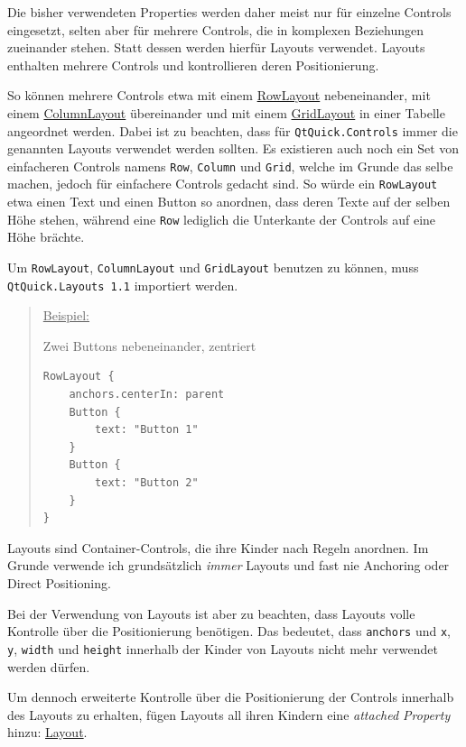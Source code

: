 \documentclass[a4paper]{article}
\begin{document}
Die bisher verwendeten Properties werden daher meist nur für einzelne Controls eingesetzt, selten aber für mehrere Controls, die in komplexen Beziehungen zueinander stehen. Statt dessen werden hierfür Layouts verwendet. Layouts enthalten mehrere Controls und kontrollieren deren Positionierung.

So können mehrere Controls etwa mit einem \href{http://qt-project.org/doc/qt-5/qml-qtquick-layouts-rowlayout.html}{RowLayout} nebeneinander, mit einem \href{http://qt-project.org/doc/qt-5/qml-qtquick-layouts-columnlayout.html}{ColumnLayout} übereinander und mit einem \href{http://qt-project.org/doc/qt-5/qml-qtquick-layouts-gridlayout.html}{GridLayout} in einer Tabelle angeordnet werden. Dabei ist zu beachten, dass für \verb~QtQuick.Controls~ immer die genannten Layouts verwendet werden sollten. Es existieren auch noch ein Set von einfacheren Controls namens \verb~Row~, \verb~Column~ und \verb~Grid~, welche im Grunde das selbe machen, jedoch für einfachere Controls gedacht sind. So würde ein \verb~RowLayout~ etwa einen Text und einen Button so anordnen, dass deren Texte auf der selben Höhe stehen, während eine \verb~Row~ lediglich die Unterkante der Controls auf eine Höhe brächte.

Um \verb~RowLayout~, \verb~ColumnLayout~ und \verb~GridLayout~ benutzen zu können, muss \verb~QtQuick.Layouts 1.1~ importiert werden.

\begin{quote}
\uline{Beispiel:}

Zwei Buttons nebeneinander, zentriert
\begin{verbatim}
RowLayout {
    anchors.centerIn: parent
    Button {
        text: "Button 1"
    }
    Button {
        text: "Button 2"
    }
}
\end{verbatim}
\end{quote}

Layouts sind Container-Controls, die ihre Kinder nach Regeln anordnen. Im Grunde verwende ich grundsätzlich \emph{immer} Layouts und fast nie Anchoring oder Direct Positioning.

Bei der Verwendung von Layouts ist aber zu beachten, dass Layouts volle Kontrolle über die Positionierung benötigen. Das bedeutet, dass \verb~anchors~ und \verb~x~, \verb~y~, \verb~width~ und \verb~height~ innerhalb der Kinder von Layouts nicht mehr verwendet werden dürfen.

Um dennoch erweiterte Kontrolle über die Positionierung der Controls innerhalb des Layouts zu erhalten, fügen Layouts all ihren Kindern eine \emph{attached Property} hinzu: \href{http://qt-project.org/doc/qt-5/qml-qtquick-layouts-layout.html}{Layout}.
\end{document}
